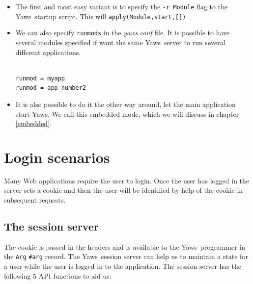 \documentclass[11pt,oneside,english]{book}
\newcommand{\Yaws}            %
        {{\sc Yaws}}
\begin{document}
\begin{itemize}
\item The first and most easy variant is to specify the
  \verb+-r Module+ flag to the \Yaws\ startup script.  This will
  \verb+apply(Module,start,[])+

\item We can also specify \verb+runmods+ in the \textit{yaws.conf}
  file.  It is possible to have several modules specified if want the
  same \Yaws\ server to run several different applications.

\begin{verbatim}

runmod = myapp
runmod = app_number2

\end{verbatim}

\item It is also possible to do it the other way around, let the main
  application start \Yaws{}. We call this embedded mode, which we will
  discuss in chapter \ref{embedded}.

\end{itemize}



\section{Login scenarios}

Many Web applications require the user to login. Once the user has
logged in the server sets a cookie and then the user will be
identified by help of the cookie in subsequent requests.

\subsection{The session server}
The cookie is passed in the headers and is available to the
\Yaws\ programmer in the \verb+Arg+ \verb+#arg+ record. The
\Yaws\ session server can help us to maintain a state for a user while
the user is logged in to the application. The session server has the
following 5 API functions to aid us:
\end{document}
